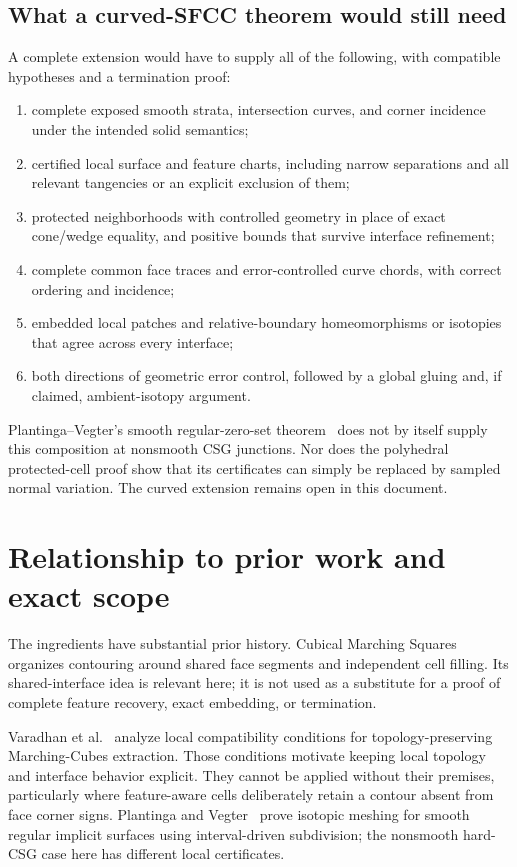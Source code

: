 \documentclass[11pt]{article}
\theoremstyle{definition}
\theoremstyle{remark}
\begin{document}
\subsection{What a curved-SFCC theorem would still need}

A complete extension would have to supply all of the following,
with compatible hypotheses and a termination proof:
\begin{enumerate}
\item complete exposed smooth strata, intersection curves, and corner
  incidence under the intended solid semantics;
\item certified local surface and feature charts, including narrow
  separations and all relevant tangencies or an explicit exclusion
  of them;
\item protected neighborhoods with controlled geometry in place of
  exact cone/wedge equality, and positive bounds that survive
  interface refinement;
\item complete common face traces and error-controlled curve chords,
  with correct ordering and incidence;
\item embedded local patches and relative-boundary homeomorphisms
  or isotopies that agree across every interface;
\item both directions of geometric error control, followed by a
  global gluing and, if claimed, ambient-isotopy argument.
\end{enumerate}
Plantinga--Vegter's smooth regular-zero-set theorem~\cite{pv} does
not by itself supply this composition at nonsmooth CSG junctions.
Nor does the polyhedral protected-cell proof show that its certificates
can simply be replaced by sampled normal variation. The curved extension
remains open in this document.

\section{Relationship to prior work and exact scope}
\label{sec:scope}

The ingredients have substantial prior history. Cubical Marching
Squares~\cite{cms} organizes contouring around shared face segments
and independent cell filling. Its shared-interface idea is relevant
here; it is not used as a substitute for a proof of complete feature
recovery, exact embedding, or termination.

Varadhan et al.~\cite{varadhan} analyze local compatibility conditions
for topology-preserving Marching-Cubes extraction. Those conditions
motivate keeping local topology and interface behavior explicit.
They cannot be applied without their premises, particularly where
feature-aware cells deliberately retain a contour absent from face
corner signs. Plantinga and Vegter~\cite{pv} prove isotopic meshing
for smooth regular implicit surfaces using interval-driven subdivision;
the nonsmooth hard-CSG case here has different local certificates.
\end{document}
